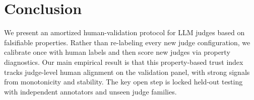 \documentclass{article}
\begin{document}
\section{Conclusion}
We present an amortized human-validation protocol for LLM judges based on falsifiable properties.
Rather than re-labeling every new judge configuration, we calibrate once with human labels and then score new judges via property diagnostics.
Our main empirical result is that this property-based trust index tracks judge-level human alignment on the validation panel, with strong signals from monotonicity and stability.
The key open step is locked held-out testing with independent annotators and unseen judge families.









\end{document}
